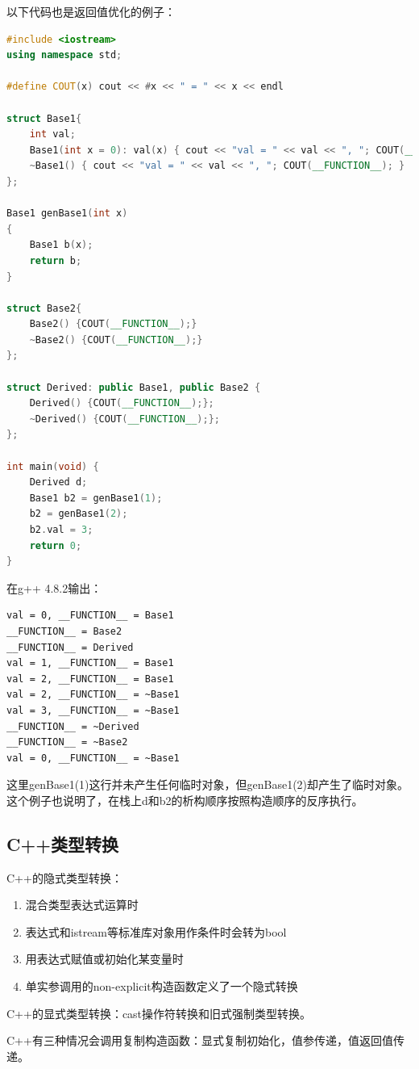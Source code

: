 以下代码也是返回值优化的例子：
\begin{lstlisting}[language=C++]
#include <iostream>
using namespace std;

#define COUT(x) cout << #x << " = " << x << endl

struct Base1{
    int val;
    Base1(int x = 0): val(x) { cout << "val = " << val << ", "; COUT(__FUNCTION__); }
    ~Base1() { cout << "val = " << val << ", "; COUT(__FUNCTION__); }
};

Base1 genBase1(int x)
{   
    Base1 b(x);
    return b;
}

struct Base2{
    Base2() {COUT(__FUNCTION__);}
    ~Base2() {COUT(__FUNCTION__);}
};

struct Derived: public Base1, public Base2 {
    Derived() {COUT(__FUNCTION__);};
    ~Derived() {COUT(__FUNCTION__);};
};

int main(void) {
    Derived d;
    Base1 b2 = genBase1(1);
    b2 = genBase1(2);
    b2.val = 3;
    return 0;
}
\end{lstlisting}

在g++ 4.8.2输出：
\begin{verbatim}
val = 0, __FUNCTION__ = Base1
__FUNCTION__ = Base2
__FUNCTION__ = Derived
val = 1, __FUNCTION__ = Base1
val = 2, __FUNCTION__ = Base1
val = 2, __FUNCTION__ = ~Base1
val = 3, __FUNCTION__ = ~Base1
__FUNCTION__ = ~Derived
__FUNCTION__ = ~Base2
val = 0, __FUNCTION__ = ~Base1
\end{verbatim}
这里genBase1(1)这行并未产生任何临时对象，但genBase1(2)却产生了临时对象。
这个例子也说明了，在栈上d和b2的析构顺序按照构造顺序的反序执行。
                             

\subsection{C++类型转换}
C++的隐式类型转换：
\begin{enumerate}
\item 混合类型表达式运算时
\item 表达式和istream等标准库对象用作条件时会转为bool
\item 用表达式赋值或初始化某变量时
\item 单实参调用的non-explicit构造函数定义了一个隐式转换
\end{enumerate}

C++的显式类型转换：cast操作符转换和旧式强制类型转换。

C++有三种情况会调用复制构造函数：显式复制初始化，值参传递，值返回值传递。

